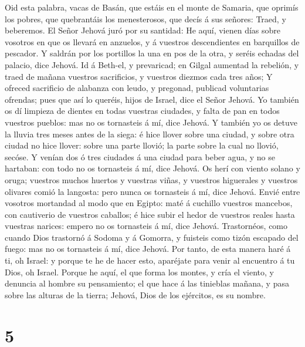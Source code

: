  Oid esta palabra, vacas de Basán, que estáis en el monte de
Samaria, que oprimís los pobres, que quebrantáis los menesterosos, que
decís á sus señores: Traed, y beberemos.  El Señor Jehová
juró por su santidad: He aquí, vienen días sobre vosotros en que os
llevará en anzuelos, y á vuestros descendientes en barquillos de
pescador.  Y saldrán por los portillos la una en pos de la
otra, y seréis echadas del palacio, dice Jehová.  Id á
Beth-el, y prevaricad; en Gilgal aumentad la rebelión, y traed de mañana
vuestros sacrificios, y vuestros diezmos cada tres años;  Y
ofreced sacrificio de alabanza con leudo, y pregonad, publicad
voluntarias ofrendas; pues que así lo queréis, hijos de Israel, dice el
Señor Jehová.  Yo también os dí limpieza de dientes en todas
vuestras ciudades, y falta de pan en todos vuestros pueblos: mas no os
tornasteis á mí, dice Jehová.  Y también yo os detuve la
lluvia tres meses antes de la siega: é hice llover sobre una ciudad, y
sobre otra ciudad no hice llover: sobre una parte llovió; la parte sobre
la cual no llovió, secóse.  Y venían dos ó tres ciudades á
una ciudad para beber agua, y no se hartaban: con todo no os tornasteis
á mí, dice Jehová.  Os herí con viento solano y oruga;
vuestros muchos huertos y vuestras viñas, y vuestros higuerales y
vuestros olivares comió la langosta: pero nunca os tornasteis á mí, dice
Jehová.  Envié entre vosotros mortandad al modo que en
Egipto: maté á cuchillo vuestros mancebos, con cautiverio de vuestros
caballos; é hice subir el hedor de vuestros reales hasta vuestras
narices: empero no os tornasteis á mí, dice Jehová. 
Trastornéos, como cuando Dios trastornó á Sodoma y á Gomorra, y fuisteis
como tizón escapado del fuego: mas no os tornasteis á mí, dice Jehová.
 Por tanto, de esta manera haré á ti, oh Israel: y porque
te he de hacer esto, aparéjate para venir al encuentro á tu Dios, oh
Israel.  Porque he aquí, el que forma los montes, y cría el
viento, y denuncia al hombre su pensamiento; el que hace á las tinieblas
mañana, y pasa sobre las alturas de la tierra; Jehová, Dios de los
ejércitos, es su nombre.

\hypertarget{section-4}{%
\section{5}\label{section-4}}

